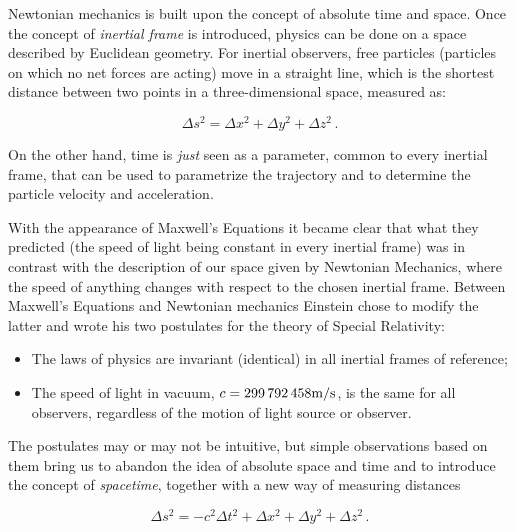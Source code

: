 
Newtonian mechanics is built upon the concept of absolute time and space.
Once the concept of \textit{inertial frame} is introduced, physics can be
done on a space described by Euclidean geometry.
For inertial observers, free particles (particles on which no net forces are
acting) move in a straight line, which is the shortest distance between two
points in a three-dimensional space, measured as:

\begin{equation}
	\Delta s^2 = \Delta x^2 + \Delta y^2 + \Delta z^2 \, .
	\label{eq:euclide}
\end{equation}

On the other hand, time is \textit{just} seen as a parameter, common to every
inertial frame, that can be used to parametrize the trajectory and to determine
the particle velocity and acceleration.

With the appearance of Maxwell's Equations it became clear that what they
predicted (the speed of light being constant in every inertial frame) was in
contrast with the description of our space given by Newtonian Mechanics, where
the speed of anything changes with respect to the chosen inertial frame.
Between Maxwell's Equations and Newtonian mechanics Einstein chose to modify
the latter and wrote his two postulates for the theory of Special Relativity:

\begin{itemize}
	\item The laws of physics are invariant (identical) in all inertial frames
	      of reference;
	\item The speed of light in vacuum,
	      $c = \num{299792458} \unit[per-mode = symbol]{\meter\per\second}$,
	      is the same for all observers, regardless of the motion of light source
	      or observer.
\end{itemize}

The postulates may or may not be intuitive, but simple observations based on
them bring us to abandon the idea of absolute space and time and to introduce
the concept of \textit{spacetime}, together with a new way of measuring
distances

\begin{equation}
	\Delta s^2 = - c^2 \Delta t^2 + \Delta x^2 + \Delta y^2 + \Delta z^2 \, .
	\label{eq:Minkowski}
\end{equation}

